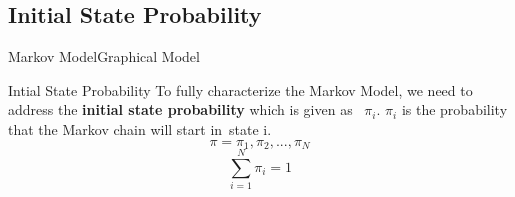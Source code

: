 \documentclass[10pt]{beamer}
\begin{document}
\subsection{Initial State Probability}
\begin{frame}{Markov Model}{Graphical Model}
  \begin{block}{Intial State Probability}
   To fully characterize the Markov Model, we need to address the 
   \textbf{initial state probability} which is given as \
   $\pi_i$. $\pi_i$ is the probability that the Markov chain will start in\
   state i.\\
        \begin{equation}
            \pi = \pi_1, \pi_2,...,\pi_N
        \end{equation}
        \begin{equation}
           \sum_{i=1}^{N}\pi_i = 1 
        \end{equation}
  \end{block}
\end{frame}

\end{document}
